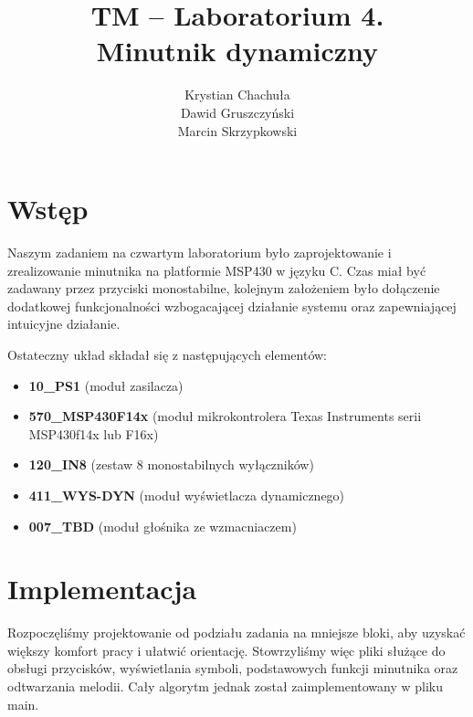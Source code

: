 \documentclass[fleqn]{article}
\title{TM -- Laboratorium 4. \\ \large Minutnik dynamiczny}
\author{Krystian Chachuła \\ Dawid Gruszczyński \\ Marcin Skrzypkowski}
\begin{document}
\maketitle

\setcounter{page}{0}
\thispagestyle{empty}

\pagebreak

\setcounter{page}{1}

\section{Wstęp}

Naszym zadaniem na czwartym laboratorium było zaprojektowanie i zrealizowanie minutnika na platformie MSP430 w języku C. Czas miał być zadawany przez przyciski monostabilne, kolejnym założeniem było dołączenie dodatkowej funkcjonalności wzbogacającej działanie systemu oraz zapewniającej intuicyjne działanie.

Ostateczny układ składał się z następujących elementów:

\begin{itemize}
	\item \textbf{10\_PS1} (moduł zasilacza)
	\item \textbf{570\_MSP430F14x} (moduł mikrokontrolera Texas Instruments serii MSP430f14x lub F16x)
	\item \textbf{120\_IN8} (zestaw 8 monostabilnych wyłączników)
	\item \textbf{411\_WYS-DYN} (moduł wyświetlacza dynamicznego)
	\item \textbf{007\_TBD} (moduł głośnika ze wzmacniaczem)
\end{itemize}

\pagebreak

\section{Implementacja}

Rozpoczęliśmy projektowanie od podziału zadania na mniejsze bloki, aby uzyskać większy komfort pracy i ułatwić orientację. Stowrzyliśmy więc pliki służące do obsługi przycisków, wyświetlania symboli, podstawowych funkcji minutnika oraz odtwarzania melodii. Cały algorytm jednak został zaimplementowany w pliku main.
\end{document}

